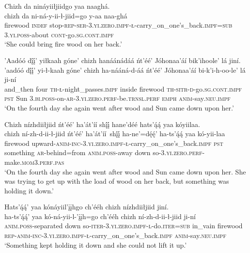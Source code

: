 \ea\label{ex:text5-7-4}
Chizh da nináyiiłjiidgo yaa naaghá.\\
\gll chizh	da	ni-ná-y-ii-ł-jiid=go	y-aa	naa-ghá\\
     firewood	\textsc{indef}	stop-\textsc{rep}-\textsc{ser}-3.\textsc{yi}.\textsc{zero}.\textsc{impf}-\textsc{ł}-carry\_on\_one's\_back.\textsc{impf}=\textsc{sub}	3.\textsc{yi}.\textsc{poss}-about	\textsc{cont}-go.\textsc{sg}.\textsc{cont}.\textsc{impf}\\
\glt `She could bring fire wood on her back.'
\z

\ea\label{ex:text5-7-5}
’Aadóó dį́į́’ yiłkaah góne’ chizh hanáánádáá ńt’éé’ Jóhonaa’áí bik’ihoole’ lá jiní.\\
\gll ’aadóó	dį́į́’	yi-ł-kaah	góne’	chizh	ha-nááná-d-áá	ńt’éé’	Jóhonaa’áí	bi-k’i-h-oo-le’	lá	ji-ní\\
     and\_then	four	\textsc{th}-\textsc{ł}-night\_passes.\textsc{impf}	inside	firewood	\textsc{th}-\textsc{sitr}-\textsc{d}-go.\textsc{sg}.\textsc{cont}.\textsc{impf}	\textsc{pst}	Sun	3.\textsc{bi}.\textsc{poss}-on-\textsc{ar}-3.\textsc{yi}.\textsc{zero}.\textsc{perf}-be.\textsc{trnsl}.\textsc{perf}	\textsc{emph}	\textsc{anim}-say.\textsc{neu}.\textsc{impf}\\
\glt `On the fourth day she again went after wood and Sun came down upon her.'
\z

\ea\label{ex:text5-7-6}
Chizh nízhdiiłjiid ńt’éé’ ha’át’íí shį́į́ hane’déé hats’ą́ą́ yaa kóyiilaa.\\
\gll chizh	ní-zh-d-ii-ł-jiid	ńt’éé’	ha’át’íí~{shį́į́}	ha-ne’=dę́ę́’	ha-ts’ą́ą́	yaa	kó-yii-laa\\
     firewood	upward-\textsc{anim}-\textsc{inc}-3.\textsc{yi}.\textsc{zero}.\textsc{impf}-\textsc{ł}-carry\_on\_one's\_back.\textsc{impf}	\textsc{pst}	something	\textsc{ar}-behind=from	\textsc{anim}.\textsc{poss}-away	down	so-3.\textsc{yi}.\textsc{zero}.\textsc{perf}-make.\textsc{mom}3.\textsc{perf}.\textsc{pas}\\
\glt `On the fourth day she again went after wood and Sun came down upon her. She was trying to get up with the load of wood on her back, but something was holding it down.'
\z

\ea\label{ex:text5-7-7}
Hats’ą́ą́’ yaa kónáyiil’įįhgo ch’ééh chizh nízhdiiłjiid jiní.\\
\gll ha-ts’ą́ą́’	yaa	kó-ná-yii-l-’įįh=go	ch’ééh	chizh	ní-zh-d-ii-ł-jiid	ji-ní\\
     \textsc{anim}.\textsc{poss}-separated	down	so-\textsc{iter}-3.\textsc{yi}.\textsc{zero}.\textsc{impf}-\textsc{l}-do.\textsc{iter}=\textsc{sub}	in\_vain	firewood	\textsc{rep}-\textsc{anim}-\textsc{inc}-3.\textsc{yi}.\textsc{zero}.\textsc{impf}-\textsc{ł}-carry\_on\_one's\_back.\textsc{impf}	\textsc{anim}-say.\textsc{neu}.\textsc{impf}\\
\glt `Something kept holding it down and she could not lift it up.'
\z


